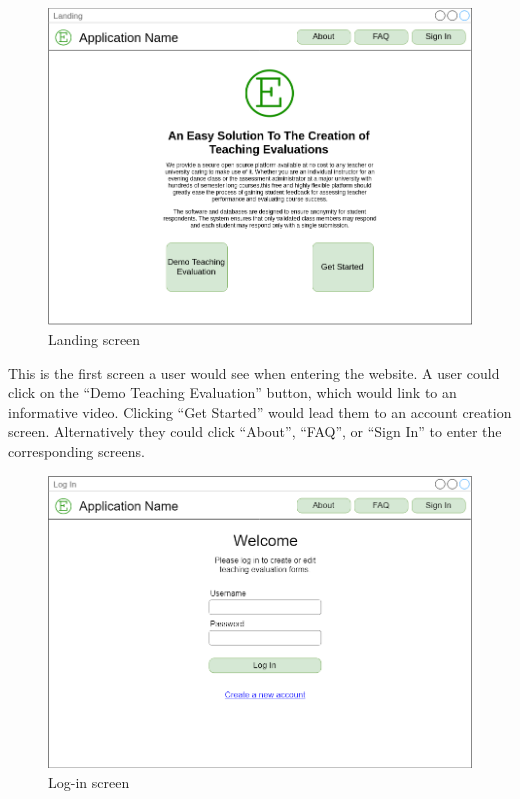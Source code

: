 \documentclass{article}
\begin{document}
\begin{center}
\begin{figure}[H]
    \centering
    \caption{Landing screen}
    \includegraphics[width=6.5in]{images/landing_screen.png}
\end{figure}
\end{center}

This is the first screen a user would see when entering the website. A user could click on the ``Demo Teaching Evaluation'' button, which would link to an informative video. Clicking ``Get Started'' would lead them to an account creation screen. Alternatively they could click ``About'', ``FAQ'', or ``Sign In'' to enter the corresponding screens.

\newpage

\begin{center}
\begin{figure}[H]
    \centering
    \caption{Log-in screen}
    \includegraphics[width=6.5in]{images/login_screen.png}
\end{figure}
\end{center}
\end{document}
